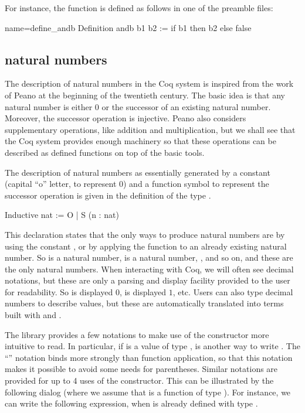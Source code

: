 For instance, the function  is defined as follows in one of
the preamble files:

\begin{coq}{name=define_andb}{}
Definition andb b1 b2 := if b1 then b2 else false
\end{coq}


\subsection{natural numbers}
The description of natural numbers in the Coq system is inspired from
the work of Peano at the beginning of the twentieth century.  The
basic idea is that any natural number is either 0 or the successor of
an existing natural number.  Moreover, the successor operation is
injective.  Peano also considers supplementary operations, like
addition and multiplication, but we shall see that the Coq system
provides enough machinery so that these operations can be described as
defined functions on top of the basic tools.

The description of natural numbers as essentially generated by a
constant  (capital ``o'' letter, to represent $0$) and a function symbol  to represent 
the successor operation is given in the definition of the type
.

\begin{coq}{}{}
Inductive nat := O | S (n : nat)
\end{coq}

This declaration states that the only ways to produce natural numbers
are by using the constant , or by applying the function  to
an already existing natural number.  So  is a natural number,
 is a
natural number, , and so on, and these are the only natural
numbers.  When interacting with Coq, we will often see decimal
notations, but these are only a parsing and display
facility provided to the user for readability.  So  is displayed
$0$,  is displayed $1$, etc.  Users can also type decimal
numbers to describe values, but these are automatically translated into
terms built with  and .

The \mcbMC{} library provides a few notations to make use of the
constructor  more intuitive to read.  In particular, if 
is a value of type ,  is another way to write .  The ``'' notation binds more strongly than function
application, so that this notation makes it possible to avoid some
needs for parentheses.
Similar notations are provided for up to 4 uses of the 
constructor.  This can be illustrated by the following dialog (where
we assume that  is a function of type ).
  For instance, we can write the following
expression, when  is already defined with type .

